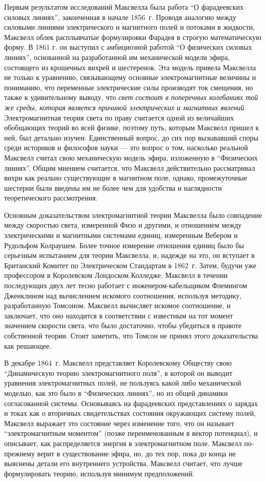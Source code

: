 \documentclass[12pt, oneside, a4paper]{article}
\begin{document}
Первым результатом исследований Максвелла была работа ``О фарадеевских силовых линиях'', законченная в начале 1856~г. Проводя аналогию между силовыми линиями электрического и магнитного полей и потоками в жидкости, Максвелл облек расплывчатые формулировки Фарадея в строгую математическую форму. В 1861 г. он выступил с амбициозной работой ``О физических силовых линиях'', основанной на разработанной им механической модели эфира, состоящего из крошечных вихрей и шестеренок. Эта модель привела Максвелла не только к уравнению, связывающему основные электромагнитные величины и пониманию, что переменные электрические силы производят ток смещения, но также к удивительному выводу, что \emph{свет состоит в поперечных колебаниях той же среды, которая является причиной электрических и магнитных явлений}. 
Электромагнитная теория света по праву считается одной из величайших обобщающих теорий во всей физике, поэтому путь, которым Максвелл пришел к ней, был детально изучен. Единственный вопрос, до сих пор вызывавший споры среди историков и философов науки --- это вопрос о том, насколько реальной Максвелл считал свою механическую модель эфира, изложенную в ``Физических линиях''. Общим мнением считается, что Максвелл действительно рассматривал вихри как реально существующие в магнитном поле, однако, промежуточные шестерни были введены им не более чем для удобства и наглядности теоретического рассмотрения. 

Основным доказательством электромагнитной теории Максвелла было совпадение между скоростью света, измеренной Физо и другими, и отношением между электрическими и магнитными системами единиц, измеренным Вебером  и Рудольфом Колраушем. Более точное измерение отношения единиц было бы серьезным испытанием для теории Максвелла, и, надежде на это, он вступает в Британский Комитет по Электрическом Стандартам в 1862~г. Затем, будучи уже профессором в Королевском Лондоском Колледже, Максвелл в течении последующих двух лет тесно работает с инженером-кабельщиком Флемингом Дженклином над вычислением искомого соотношения, используя методику, разработанную Томсоном. Максвелл вычисляет искомое соотношение, и заключает, что оно находится в соответствии с известным на тот момент значением скорости света, что было достаточно, чтобы убедиться в правоте собственной теории. Стоит заметить, что Томсон не принял этого доказательства как решающее. 

В декабре 1864~г. Максвелл представляет Королевскому Обществу свою ``Динамическую теорию электромагнитного поля'', в которой он выводит уравнения электромагнитных полей, не пользуясь какой либо механической моделью, как это было в ``Физических линиях'', но из общей динамики согласованной системы. Основываясь на фарадеевских представлениях о зарядах и токах как о вторичных свидетельствах состояния окружающих систему полей, Максвелл выражает это состояние через изменение того, что он называет ``электромагнитным моментом'' (позже переименованным в вектор потенциал), и описывает, как распределяется энергия в электромагнитном поле. Максвелл по-прежнему верит в существование эфира, но, до тех пор, пока до конца не выяснены детали его внутреннего устройства, Максвелл считает, что лучше формулировать теорию, используя минимум предположений. 
\end{document}
